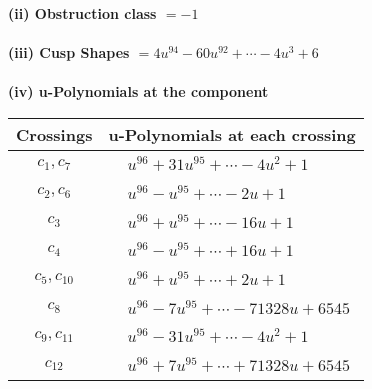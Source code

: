 \documentclass[1p]{elsarticle_modified}
\theoremstyle{definition}
\begin{document}
\flushleft \textbf{(ii) Obstruction class $= -1$}\\~\\
\flushleft \textbf{(iii) Cusp Shapes $= 4 u^{94}-60 u^{92}+\cdots-4 u^3+6$}\\~\\
\newpage\renewcommand{\arraystretch}{1}
\flushleft \textbf{(iv) u-Polynomials at the component}\newline \\
\begin{tabular}{m{50pt}|m{274pt}}
Crossings & \hspace{64pt}u-Polynomials at each crossing \\
\hline $$\begin{aligned}c_{1},c_{7}\end{aligned}$$&$\begin{aligned}
&u^{96}+31 u^{95}+\cdots-4 u^2+1
\end{aligned}$\\
\hline $$\begin{aligned}c_{2},c_{6}\end{aligned}$$&$\begin{aligned}
&u^{96}- u^{95}+\cdots-2 u+1
\end{aligned}$\\
\hline $$\begin{aligned}c_{3}\end{aligned}$$&$\begin{aligned}
&u^{96}+u^{95}+\cdots-16 u+1
\end{aligned}$\\
\hline $$\begin{aligned}c_{4}\end{aligned}$$&$\begin{aligned}
&u^{96}- u^{95}+\cdots+16 u+1
\end{aligned}$\\
\hline $$\begin{aligned}c_{5},c_{10}\end{aligned}$$&$\begin{aligned}
&u^{96}+u^{95}+\cdots+2 u+1
\end{aligned}$\\
\hline $$\begin{aligned}c_{8}\end{aligned}$$&$\begin{aligned}
&u^{96}-7 u^{95}+\cdots-71328 u+6545
\end{aligned}$\\
\hline $$\begin{aligned}c_{9},c_{11}\end{aligned}$$&$\begin{aligned}
&u^{96}-31 u^{95}+\cdots-4 u^2+1
\end{aligned}$\\
\hline $$\begin{aligned}c_{12}\end{aligned}$$&$\begin{aligned}
&u^{96}+7 u^{95}+\cdots+71328 u+6545
\end{aligned}$\\
\hline
\end{tabular}\\~\\
\end{document}
